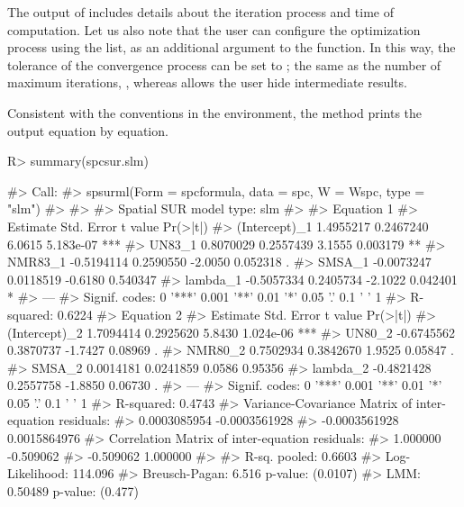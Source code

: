 \documentclass[article]{jss}
\begin{document}
The output of  includes details about the iteration process and time of computation. Let us also note that the user can configure the optimization process using the  list, as an additional argument to the function. In this way, the tolerance of the convergence process can be set to ; the same as the number of maximum iterations, , whereas  allows the user hide intermediate results.

Consistent with the conventions in the  environment, the  method prints the output equation by equation.

\begin{CodeChunk}

\begin{CodeInput}
R> summary(spcsur.slm)
\end{CodeInput}

\begin{CodeOutput}
#> Call:
#> spsurml(Form = spcformula, data = spc, W = Wspc, type = "slm")
#> 
#>  
#> Spatial SUR model type:  slm 
#> 
#> Equation  1 
#>                 Estimate Std. Error t value  Pr(>|t|)    
#> (Intercept)_1  1.4955217  0.2467240  6.0615 5.183e-07 ***
#> UN83_1         0.8070029  0.2557439  3.1555  0.003179 ** 
#> NMR83_1       -0.5194114  0.2590550 -2.0050  0.052318 .  
#> SMSA_1        -0.0073247  0.0118519 -0.6180  0.540347    
#> lambda_1      -0.5057334  0.2405734 -2.1022  0.042401 *  
#> ---
#> Signif. codes:  0 '***' 0.001 '**' 0.01 '*' 0.05 '.' 0.1 ' ' 1
#> R-squared: 0.6224 
#>   Equation  2 
#>                 Estimate Std. Error t value  Pr(>|t|)    
#> (Intercept)_2  1.7094414  0.2925620  5.8430 1.024e-06 ***
#> UN80_2        -0.6745562  0.3870737 -1.7427   0.08969 .  
#> NMR80_2        0.7502934  0.3842670  1.9525   0.05847 .  
#> SMSA_2         0.0014181  0.0241859  0.0586   0.95356    
#> lambda_2      -0.4821428  0.2557758 -1.8850   0.06730 .  
#> ---
#> Signif. codes:  0 '***' 0.001 '**' 0.01 '*' 0.05 '.' 0.1 ' ' 1
#> R-squared: 0.4743 
#>   Variance-Covariance Matrix of inter-equation residuals:                            
#>   0.0003085954 -0.0003561928
#>  -0.0003561928  0.0015864976
#> Correlation Matrix of inter-equation residuals:                    
#>   1.000000 -0.509062
#>  -0.509062  1.000000
#> 
#>  R-sq. pooled: 0.6603 
#>  Log-Likelihood:  114.096
#>  Breusch-Pagan: 6.516  p-value: (0.0107) 
#>  LMM: 0.50489  p-value: (0.477)
\end{CodeOutput}
\end{CodeChunk}
\end{document}
